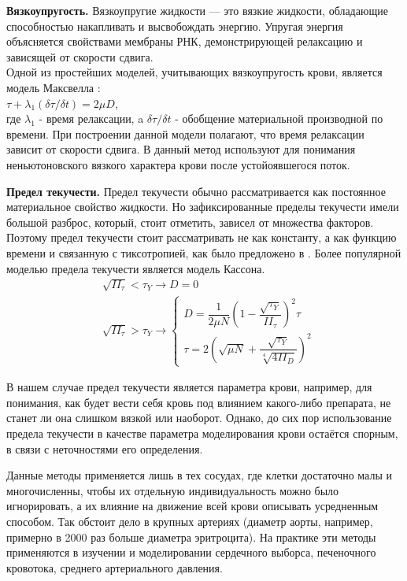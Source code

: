 \documentclass[a4paper, 14pt]{article}
\begin{document}
\textbf{Вязкоупругость.}
Вязкоупругие жидкости — это вязкие жидкости, обладающие способностью накапливать и высвобождать энергию. Упругая энергия объясняется свойствами мембраны РНК, демонстрирующей релаксацию \cite{evans:1976} и зависящей от скорости сдвига.\\
Одной из простейших моделей, учитывающих вязкоупругость крови, является модель Максвелла \cite{thurston:1972}:\\
$\tau+\lambda_1(\delta\tau / \delta t)=2\mu D$,\\  где 
$\lambda_1$ 
- время релаксации, a 
$\delta\tau / \delta t$
- обобщение материальной производной по времени.
При построении данной модели полагают, что время релаксации зависит от скорости сдвига.
В \cite{thurston:1994} данный метод используют для понимания неньютоновского вязкого характера крови после устойоявшегося поток.

\textbf{Предел текучести.}
Предел текучести обычно рассматривается как постоянное материальное свойство жидкости. Но зафиксированные пределы текучести имели большой разброс, который, стоит отметить, зависел от множества факторов.
Поэтому предел текучести стоит рассматривать не как константу, а как функцию времени и связанную с тиксотропией, как было предложено в \cite{moller:2006}.
Более популярной моделью предела текучести является модель Кассона.
$$
\begin{aligned}
	&\sqrt{II_\tau} < \tau_Y\longrightarrow D=0 \\
	&\sqrt{II_\tau} > \tau_Y\longrightarrow
	\begin{cases}
		D   = \dfrac{1}{2\mu N}(1-\dfrac{\sqrt{\tau_Y}}{II_\tau})^2\tau \\[10pt]
		\tau= 2(\sqrt{\mu N}+\dfrac{\sqrt{\tau_Y}}{\sqrt[4]{4II_D}})^2
	\end{cases}
\end{aligned}
$$

В нашем случае предел текучести является параметра крови, например, для понимания, как будет вести себя кровь под влиянием какого-либо препарата, не станет ли она слишком вязкой или наоборот.
Однако, до сих пор использование предела текучести в качестве параметра моделирования крови остаётся спорным, в связи с неточностями его определения.

Данные методы применяется лишь в тех сосудах, где клетки достаточно малы и 
многочисленны, чтобы их отдельную индивидуальность можно было игнорировать, а их влияние на движение всей крови описывать усредненным способом. Так обстоит дело в крупных артериях (диаметр аорты, например, примерно в 2000 раз больше диаметра эритроцита). 
На практике эти методы применяются в изучении и моделировании сердечного выборса, печеночного кровотока, среднего артериального давления.
\end{document}
